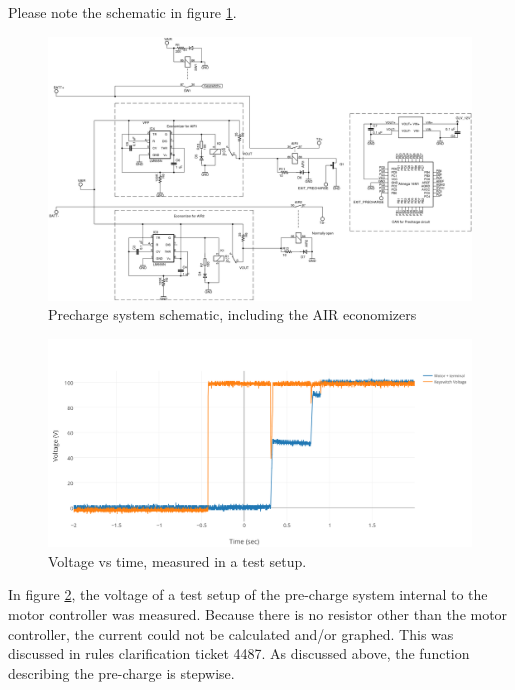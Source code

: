 \documentclass{article}
\begin{document}
        Please note the schematic in figure \ref{prechargeschem}.

        \begin{figure}
            \includegraphics[width=\textheight]{precharge}
            \caption{Precharge system schematic, including the AIR economizers}
            \label{prechargeschem}
        \end{figure}

            \begin{figure}[H]
                \centering
                \includegraphics[width = 0.8 \textwidth]{PrechargeVoltage}
                \caption{Voltage vs time, measured in a test setup. }
                \label{PCvoltage}
            \end{figure}

            In figure \ref{PCvoltage}, the voltage of a test setup of the pre-charge system internal to the motor controller was measured. Because there is no resistor other than the motor controller, the current could not be calculated and/or graphed. This was discussed in rules clarification ticket 4487. As discussed above, the function describing the pre-charge is stepwise.
\end{document}
